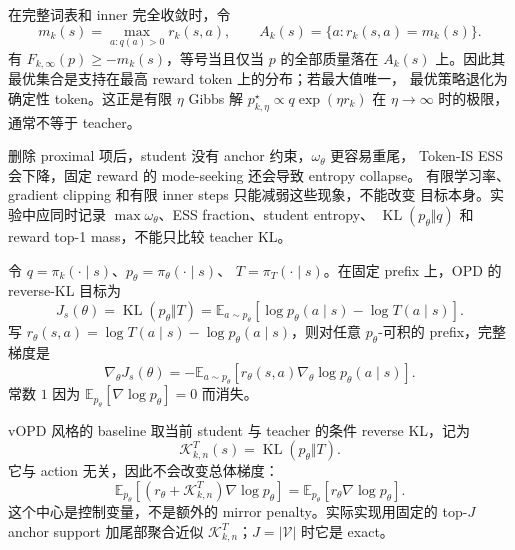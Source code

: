 在完整词表和 inner 完全收敛时，令
\begin{equation}
m_k(s)=\max_{a:q(a)>0}r_k(s,a),\qquad
A_k(s)=\{a:r_k(s,a)=m_k(s)\}.
\end{equation}
有 $F_{k,\infty}(p)\geq-m_k(s)$，等号当且仅当 $p$ 的全部质量落在
$A_k(s)$ 上。因此其最优集合是支持在最高 reward token 上的分布；若最大值唯一，
最优策略退化为确定性 token。这正是有限 $\eta$ Gibbs 解
$p_{k,\eta}^\star\propto q\exp(\eta r_k)$ 在 $\eta\to\infty$ 时的极限，
通常不等于 teacher。

删除 proximal 项后，student 没有 anchor 约束，$\omega_\theta$ 更容易重尾，
Token-IS ESS 会下降，固定 reward 的 mode-seeking 还会导致 entropy collapse。
有限学习率、gradient clipping 和有限 inner steps 只能减弱这些现象，不能改变
目标本身。实验中应同时记录 $\max\omega_\theta$、ESS fraction、student entropy、
$\operatorname{KL}(p_\theta\Vert q)$ 和 reward top-1 mass，不能只比较 teacher KL。

令 $q=\pi_k(\cdot\mid s)$、$p_\theta=\pi_\theta(\cdot\mid s)$、
$T=\pi_T(\cdot\mid s)$。在固定 prefix 上，OPD 的 reverse-KL 目标为
\begin{equation}
\label{eq:ch2-opd-baseline-objective}
J_s(\theta)=\operatorname{KL}(p_\theta\Vert T)
 =\mathbb E_{a\sim p_\theta}
 \left[\log p_\theta(a\mid s)-\log T(a\mid s)\right].
\end{equation}
写 $r_\theta(s,a)=\log T(a\mid s)-\log p_\theta(a\mid s)$，则对任意
$p_\theta$-可积的 prefix，完整梯度是
\begin{equation}
\label{eq:ch2-opd-baseline-gradient}
\nabla_\theta J_s(\theta)
 =-\mathbb E_{a\sim p_\theta}
 \left[r_\theta(s,a)\nabla_\theta\log p_\theta(a\mid s)\right].
\end{equation}
常数 $1$ 因为 $\mathbb E_{p_\theta}[\nabla\log p_\theta]=0$ 而消失。

vOPD 风格的 baseline 取当前 student 与 teacher 的条件 reverse KL，记为
\begin{equation}
\label{eq:ch2-opd-vopd-center}
 \mathcal K_{k,n}^{T}(s)=\operatorname{KL}(p_\theta\Vert T).
\end{equation}
它与 action 无关，因此不会改变总体梯度：
\begin{equation}
\mathbb E_{p_\theta}[(r_\theta+\mathcal K_{k,n}^{T})\nabla\log p_\theta]
 =\mathbb E_{p_\theta}[r_\theta\nabla\log p_\theta].
\end{equation}
这个中心是控制变量，不是额外的 mirror penalty。实际实现用固定的 top-$J$
anchor support 加尾部聚合近似 $\mathcal K_{k,n}^{T}$；$J=|\mathcal V|$ 时它是 exact。


